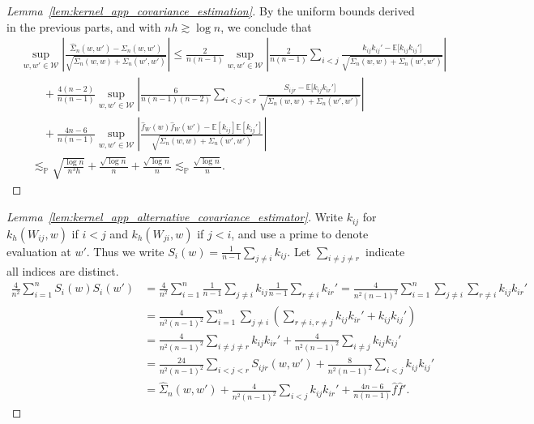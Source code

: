\documentclass[11pt,lof]{puthesis}
\renewcommand{\P}{\ensuremath{\mathbb{P}}}
\newcommand{\E}{\ensuremath{\mathbb{E}}}
\newcommand{\cW}{\ensuremath{\mathcal{W}}}
\theoremstyle{break}
\theoremstyle{proof}
\newtheorem{proof}{Proof}
\begin{document}
\begin{proof}[Lemma~\ref{lem:kernel_app_covariance_estimation}]
  By the uniform bounds derived in the previous parts,
  and with $n h \gtrsim \log n$, we conclude that
  \begin{align*}
    &\sup_{w,w' \in \cW}
    \left|
    \frac{\hat \Sigma_n(w,w') - \Sigma_n(w,w')}
    {\sqrt{\Sigma_n(w,w) + \Sigma_n(w',w')}}
    \right|
    \leq
    \frac{2}{n(n-1)}
    \sup_{w,w' \in \cW}
    \left|
    \frac{2}{n(n-1)}
    \!\sum_{i<j}\!
    \frac{k_{i j} k_{i j}' - \E\big[k_{i j} k_{i j}']}
    {\sqrt{\Sigma_n(w,w) + \Sigma_n(w',w')}}
    \right| \\
    &\qquad+
    \frac{4(n-2)}{n(n-1)}
    \sup_{w,w' \in \cW}
    \left|
    \frac{6}{n(n-1)(n-2)}
    \sum_{i<j<r}
    \frac{S_{i j r} - \E\big[k_{i j} k_{i r}']}
    {\sqrt{\Sigma_n(w,w) + \Sigma_n(w',w')}}
    \right| \\
    &\qquad+
    \frac{4n-6}{n(n-1)}
    \sup_{w,w' \in \cW}
    \left|
    \frac{\hat f_W(w) \hat f_W(w') - \E[k_{i j}] \E[k_{i j}']}
    {\sqrt{\Sigma_n(w,w) + \Sigma_n(w',w')}}
    \right| \\
    &\quad\lesssim_\P
    \sqrt{\frac{\log n}{n^3h}}
    + \frac{\sqrt{\log n}}{n}
    + \frac{\sqrt{\log n}}{n}
    \lesssim_\P
    \frac{\sqrt{\log n}}{n}.
  \end{align*}
\end{proof}

\begin{proof}[Lemma~\ref{lem:kernel_app_alternative_covariance_estimator}]

  Write $k_{i j}$ for $k_h(W_{i j},w)$
  if $i<j$ and $k_h(W_{j i},w)$ if $j<i$,
  and use a prime to denote evaluation at $w'$.
  Thus we write $S_i(w) = \frac{1}{n-1} \sum_{j \neq i} k_{i j}$.
  Let $\sum_{i \neq j \neq r}$ indicate all indices are distinct.
  \begin{align*}
    \frac{4}{n^2}
    \sum_{i=1}^n
    S_i(w) S_i(w')
    &=
    \frac{4}{n^2}
    \sum_{i=1}^n
    \frac{1}{n-1}
    \sum_{j \neq i}
    k_{i j}
    \frac{1}{n-1}
    \sum_{r \neq i}
    k_{i r}'
    =
    \frac{4}{n^2(n-1)^2}
    \sum_{i=1}^n
    \sum_{j \neq i}
    \sum_{r \neq i}
    k_{i j}
    k_{i r}' \\
    &=
    \frac{4}{n^2(n-1)^2}
    \sum_{i=1}^n
    \sum_{j \neq i}
    \left(
      \sum_{r \neq i, r \neq j}
      k_{i j}
      k_{i r}'
      + k_{i j}
      k_{i j}'
    \right) \\
    &=
    \frac{4}{n^2(n-1)^2}
    \sum_{i \neq j \neq r}
    k_{i j}
    k_{i r}'
    + \frac{4}{n^2(n-1)^2}
    \sum_{i \neq j}
    k_{i j}
    k_{i j}' \\
    &=
    \frac{24}{n^2(n-1)^2}
    \sum_{i < j < r}
    S_{i j r}(w,w')
    + \frac{8}{n^2(n-1)^2}
    \sum_{i < j}
    k_{i j}
    k_{i j}' \\
    &=
    \hat \Sigma_n(w,w')
    + \frac{4}{n^2(n-1)^2}
    \sum_{i < j}
    k_{i j}
    k_{i r}'
    + \frac{4n-6}{n(n-1)}
    \hat f
    \hat f'.
  \end{align*}
\end{proof}
\end{document}
